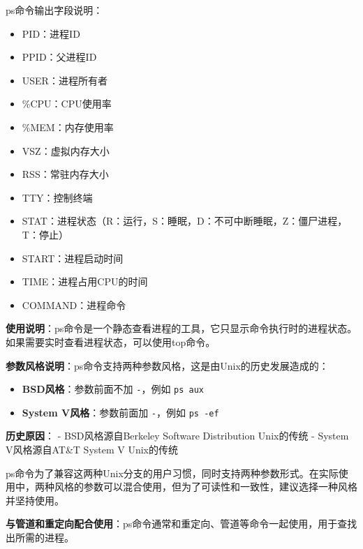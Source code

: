 \documentclass[12pt,UTF8]{ctexbook}
\begin{document}
ps命令输出字段说明：
\begin{itemize}
    \item PID：进程ID
    \item PPID：父进程ID
    \item USER：进程所有者
    \item \%CPU：CPU使用率
    \item \%MEM：内存使用率
    \item VSZ：虚拟内存大小
    \item RSS：常驻内存大小
    \item TTY：控制终端
    \item STAT：进程状态（R：运行，S：睡眠，D：不可中断睡眠，Z：僵尸进程，T：停止）
    \item START：进程启动时间
    \item TIME：进程占用CPU的时间
    \item COMMAND：进程命令
\end{itemize}

\textbf{使用说明}：ps命令是一个静态查看进程的工具，它只显示命令执行时的进程状态。如果需要实时查看进程状态，可以使用top命令。

\textbf{参数风格说明}：ps命令支持两种参数风格，这是由Unix的历史发展造成的：
\begin{itemize}
    \item \textbf{BSD风格}：参数前面不加 \texttt{-}，例如 \texttt{ps aux}
    \item \textbf{System V风格}：参数前面加 \texttt{-}，例如 \texttt{ps -ef}
\end{itemize}

\textbf{历史原因}：
- BSD风格源自Berkeley Software Distribution Unix的传统
- System V风格源自AT\&T System V Unix的传统

ps命令为了兼容这两种Unix分支的用户习惯，同时支持两种参数形式。在实际使用中，两种风格的参数可以混合使用，但为了可读性和一致性，建议选择一种风格并坚持使用。

\textbf{与管道和重定向配合使用}：ps命令通常和重定向、管道等命令一起使用，用于查找出所需的进程。
\end{document}
